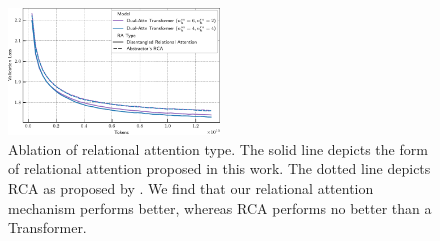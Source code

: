 \begin{figure}[ht]
    \centering
    \includegraphics[width=0.5\textwidth]{figs/experiments/tiny_stories/d64L4_ra_type_ablation_symattn_asymra.pdf}
    \caption{Ablation of relational attention type. The solid line depicts the form of relational attention proposed in this work. The dotted line depicts RCA as proposed by \citet{altabaa2024abstractors}. We find that our relational attention mechanism performs better, whereas RCA performs no better than a Transformer.}\label{fig:tinystories_ratype_ablation}
\end{figure}